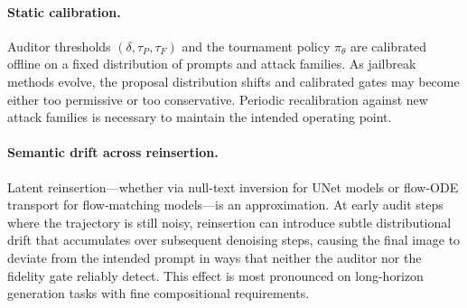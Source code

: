 \documentclass[11pt]{article}
\begin{document}
\paragraph{Static calibration.}
Auditor thresholds $(\delta, \tau_P, \tau_F)$ and the tournament policy
$\pi_\theta$ are calibrated offline on a fixed distribution of prompts and
attack families. As jailbreak methods evolve, the proposal distribution
shifts and calibrated gates may become either too permissive or too
conservative. Periodic recalibration against new attack families is
necessary to maintain the intended operating point.

\paragraph{Semantic drift across reinsertion.}
Latent reinsertion---whether via null-text inversion for UNet models or
flow-ODE transport for flow-matching models---is an approximation. At early
audit steps where the trajectory is still noisy, reinsertion can introduce
subtle distributional drift that accumulates over subsequent denoising steps,
causing the final image to deviate from the intended prompt in ways that
neither the auditor nor the fidelity gate reliably detect. This effect is
most pronounced on long-horizon generation tasks with fine compositional
requirements.


\clearpage
\newpage




\clearpage
\newpage

\appendix




\end{document}

